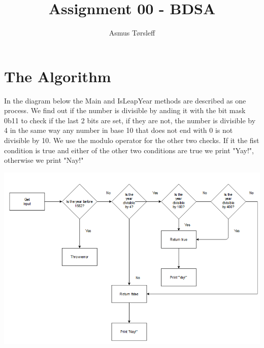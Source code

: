 \documentclass[a4paper]{article}
\title{Assignment 00 - BDSA}
\author{Asmus Tørsleff}
\begin{document}
\maketitle

\section{The Algorithm}
In the diagram below the Main and IsLeapYear methods are described as one process. We find out if the number is divisible by anding it with the bit mask 0b11 to check if the last 2 bits are set, if they are not, the number is divisible by 4 in the same way any number in base 10 that does not end with 0 is not divisible by 10. We use the modulo operator for the other two checks. If it the fist condition is true and either of the other two conditions are true we print "Yay!", otherwise we print "Nay!"

\includegraphics[width = \linewidth]{Documentation/Flowchart.PNG}
\end{document}
